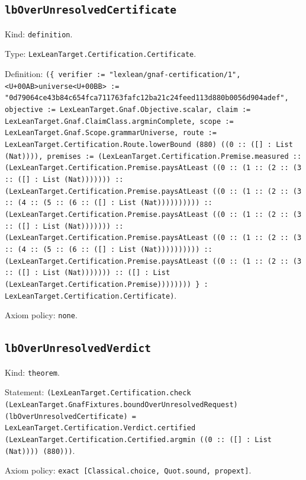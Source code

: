 \documentclass[11pt]{article}
\begin{document}
\subsection*{\texttt{lbOverUnresolvedCertificate}}
\noindent Kind: \texttt{definition}.\par
\noindent Type: \texttt{LexLeanTarget.Certification.Certificate}.\par
\noindent Definition: \texttt{(\{ verifier := "lexlean/gnaf-certification/1", <U+00AB>universe<U+00BB> := "0d79064ce43b84c654fca711763fafc12ba21c24feed113d880b0056d904adef", objective := LexLeanTarget.Gnaf.Objective.scalar, claim := LexLeanTarget.Gnaf.ClaimClass.argminComplete, scope := LexLeanTarget.Gnaf.Scope.grammarUniverse, route := LexLeanTarget.Certification.Route.lowerBound (880) ((0 :: ([] : List (Nat)))), premises := (LexLeanTarget.Certification.Premise.measured :: (LexLeanTarget.Certification.Premise.paysAtLeast ((0 :: (1 :: (2 :: (3 :: ([] : List (Nat))))))) :: (LexLeanTarget.Certification.Premise.paysAtLeast ((0 :: (1 :: (2 :: (3 :: (4 :: (5 :: (6 :: ([] : List (Nat)))))))))) :: (LexLeanTarget.Certification.Premise.paysAtLeast ((0 :: (1 :: (2 :: (3 :: ([] : List (Nat))))))) :: (LexLeanTarget.Certification.Premise.paysAtLeast ((0 :: (1 :: (2 :: (3 :: (4 :: (5 :: (6 :: ([] : List (Nat)))))))))) :: (LexLeanTarget.Certification.Premise.paysAtLeast ((0 :: (1 :: (2 :: (3 :: ([] : List (Nat))))))) :: ([] : List (LexLeanTarget.Certification.Premise)))))))) \} : LexLeanTarget.Certification.Certificate)}.\par
\noindent Axiom policy: \texttt{none}.\par
\subsection*{\texttt{lbOverUnresolvedVerdict}}
\noindent Kind: \texttt{theorem}.\par
\noindent Statement: \texttt{(LexLeanTarget.Certification.check (LexLeanTarget.GnafFixtures.boundOverUnresolvedRequest) (lbOverUnresolvedCertificate) = LexLeanTarget.Certification.Verdict.certified (LexLeanTarget.Certification.Certified.argmin ((0 :: ([] : List (Nat)))) (880)))}.\par
\noindent Axiom policy: \texttt{exact [Classical.choice, Quot.sound, propext]}.\par
\end{document}
